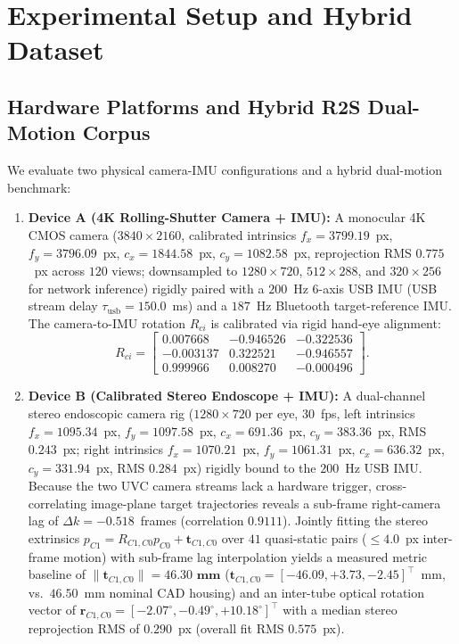 \documentclass[journal]{IEEEtran}
\begin{document}
\section{Experimental Setup and Hybrid Dataset}
\subsection{Hardware Platforms and Hybrid R2S Dual-Motion Corpus}
We evaluate two physical camera-IMU configurations and a hybrid dual-motion benchmark:
\begin{enumerate}
    \item \textbf{Device A (4K Rolling-Shutter Camera + IMU):} A monocular 4K CMOS camera ($3840\times2160$, calibrated intrinsics $f_x = 3799.19$~px, $f_y = 3796.09$~px, $c_x = 1844.58$~px, $c_y = 1082.58$~px, reprojection RMS $0.775$~px across $120$ views; downsampled to $1280\times720$, $512\times288$, and $320\times256$ for network inference) rigidly paired with a $200$~Hz 6-axis USB IMU (USB stream delay $\tau_{\text{usb}} = 150.0$~ms) and a $187$~Hz Bluetooth target-reference IMU. The camera-to-IMU rotation $R_{ci}$ is calibrated via rigid hand-eye alignment:
    \[
    R_{ci} = \begin{bmatrix}
    0.007668 & -0.946526 & -0.322536 \\
    -0.003137 & 0.322521 & -0.946557 \\
    0.999966 & 0.008270 & -0.000496
    \end{bmatrix}.
    \]
    \item \textbf{Device B (Calibrated Stereo Endoscope + IMU):} A dual-channel stereo endoscopic camera rig ($1280\times720$ per eye, $30$~fps, left intrinsics $f_x = 1095.34$~px, $f_y = 1097.58$~px, $c_x = 691.36$~px, $c_y = 383.36$~px, RMS $0.243$~px; right intrinsics $f_x = 1070.21$~px, $f_y = 1061.31$~px, $c_x = 636.32$~px, $c_y = 331.94$~px, RMS $0.284$~px) rigidly bound to the $200$~Hz USB IMU. Because the two UVC camera streams lack a hardware trigger, cross-correlating image-plane target trajectories reveals a sub-frame right-camera lag of $\Delta k = -0.518$~frames (correlation $0.9111$). Jointly fitting the stereo extrinsics $p_{C1} = R_{C1,C0}p_{C0} + \mathbf{t}_{C1,C0}$ over $41$ quasi-static pairs ($\le 4.0$~px inter-frame motion) with sub-frame lag interpolation yields a measured metric baseline of $\|\mathbf{t}_{C1,C0}\| = \mathbf{46.30\text{~mm}}$ ($\mathbf{t}_{C1,C0} = [-46.09, +3.73, -2.45]^\top$~mm, vs.\ $46.50$~mm nominal CAD housing) and an inter-tube optical rotation vector of $\mathbf{r}_{C1,C0} = [-2.07^\circ, -0.49^\circ, +10.18^\circ]^\top$ with a median stereo reprojection RMS of $0.290$~px (overall fit RMS $0.575$~px).

\end{enumerate}
\end{document}

